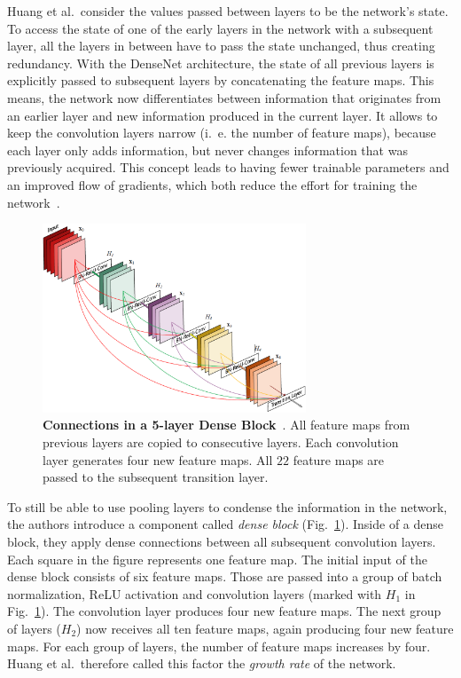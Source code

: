 Huang et al.\ consider the values passed between layers to be the network's state. To access the state of one of the early layers in the network with a subsequent layer, all the layers in between have to pass the state unchanged, thus creating redundancy. With the DenseNet architecture, the state of all previous layers is explicitly passed to subsequent layers by concatenating the feature maps. This means, the network now differentiates between information that originates from an earlier layer and new information produced in the current layer. It allows to keep the convolution layers narrow (i.~e. the number of feature maps), because each layer only adds information, but never changes information that was previously acquired. This concept leads to having fewer trainable parameters and an improved flow of gradients, which both reduce the effort for training the network~\cite{densenet17}.

\begin{figure}[h]
    \centering
    \includegraphics[width=0.7\textwidth]{images/dense-net-architecture}
    \caption[Connections in a 5-layer Dense Block]
    {\textbf{Connections in a 5-layer Dense Block}~\cite{densenet17}. All feature maps from previous layers are copied to consecutive layers. Each convolution layer generates four new feature maps. All $22$ feature maps are passed to the subsequent transition layer.}
    \label{fig:dense_block}
\end{figure}

To still be able to use pooling layers to condense the information in the network, the authors introduce a component called \emph{dense block} (Fig.~\ref{fig:dense_block}). Inside of a dense block, they apply dense connections between all subsequent convolution layers. Each square in the figure represents one feature map. The initial input of the dense block consists of six feature maps. Those are passed into a group of batch normalization, ReLU activation and convolution layers (marked with $H_1$ in Fig.~\ref{fig:dense_block}). The convolution layer produces four new feature maps. The next group of layers ($H_2$) now receives all ten feature maps, again producing four new feature maps. For each group of layers, the number of feature maps increases by four. Huang et al.\ therefore called this factor the \emph{growth rate} of the network.

